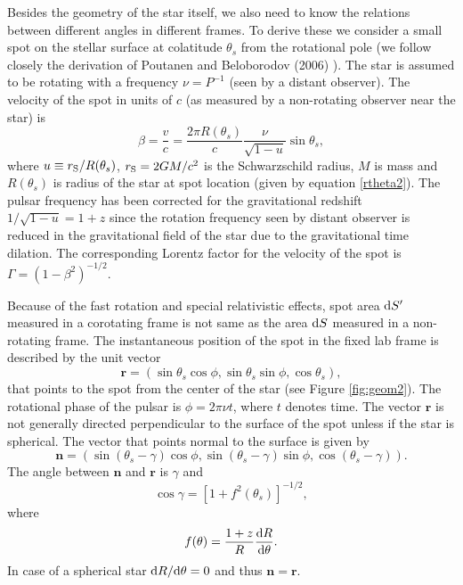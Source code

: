 \documentclass{wihuri}
\def\rg{r_{\rm S}} %
\def\be{\begin{equation}}
\def\ee{\end{equation}}
\def\d{{\rm d}}
\def\rg{r_{\rm S}} %
\def\thetas{\theta_{s}}
\newcommand{\bmath}[1]{\boldsymbol{#1}}
\begin{document}
Besides the geometry of the star itself, we also need to know the relations between different angles in different frames. To derive these we consider a small spot on the stellar surface at colatitude $\thetas$ from the rotational pole (we follow closely the derivation of Poutanen and Beloborodov (2006) \cite{poutabelo}). 
The star is assumed to be rotating  with a frequency $\nu=P^{-1}$ (seen by a distant observer).
The velocity of the spot in units of $c$ (as measured by a non-rotating observer near the star)  %
is 
\begin{equation}
\label{beta2}
\beta = \frac{v}{c}=\frac{2\pi R(\thetas)}{c} \frac{\nu}{\sqrt{1-u}} \sin\thetas, 
\end{equation}
where %
$u\equiv\rg/R(\thetas)$, 
$\rg=2GM/c^2$ is the Schwarzschild radius, $M$ is mass and $R(\thetas)$ is
radius of the star at spot location (given by equation \ref{rtheta2}). The pulsar frequency has been corrected for the gravitational redshift $1/\sqrt{1-u}=1+z$ since the rotation frequency seen by distant observer is reduced in the gravitational field of the star due to the gravitational time dilation. The corresponding Lorentz factor for the velocity of the spot is $\Gamma=(1-\beta^2)^{-1/2}$.

Because of the fast rotation and special relativistic effects, spot area $\d S^\prime$ measured in a corotating frame is not same as the area $\d S$ measured in a non-rotating frame. The instantaneous position of the spot in the fixed lab frame is described by the unit vector 
\begin{equation}
\bmath{r}=(\sin\thetas\cos\phi, \sin\thetas\sin\phi, \cos\thetas),
\end{equation}
that points to the spot from the center of the star (see Figure \ref{fig:geom2}). The rotational phase of the pulsar is $\phi=2\pi\nu t$, where $t$ denotes time. The vector $\bmath{r}$ is not generally directed perpendicular to the surface of the spot unless if the star is spherical. The vector that points normal to the surface is given by
\begin{equation}
\bmath{n}=(\sin(\thetas-\gamma)\cos\phi, \sin(\thetas-\gamma)\sin\phi, \cos(\thetas-\gamma)).
\end{equation}
The angle between $\bmath{n}$ and $\bmath{r}$ is $\gamma$ and 
\begin{equation}
\cos\gamma=[1+f^{2}(\thetas)]^{-1/2},
\end{equation}
where
\be \label{eq:ftheta}
f(\theta)=\frac{1+z}{R}\frac{\d R}{\d \theta}.
\ee
In case of a spherical star $\d R / \d \theta = 0$ and thus $\bmath{n} = \bmath{r}$.
\end{document}
